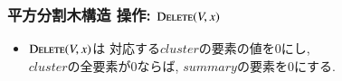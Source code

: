 \documentclass[main]{subfiles}
\begin{document}
\begin{frame}\frametitle{平方分割木構造 操作: $\mathrm{\text{D\textsc{elete}}}(V,x)$}
\begin{itemize}
\item $\mathrm{\text{D\textsc{elete}}}(V,x)$は 対応する$cluster$の要素の値を$0$にし, \\$cluster$の全要素が$0$ならば, $summary$の要素を$0$にする.
\end{itemize}
 

\end{frame}
\end{document}
